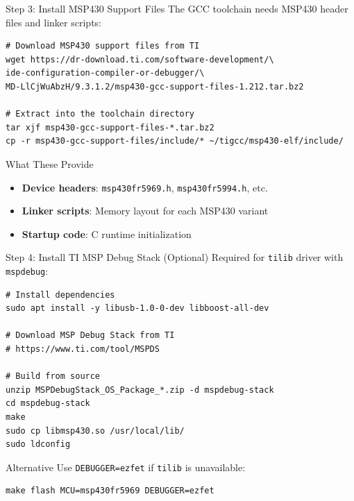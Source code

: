 \documentclass[aspectratio=169, 10pt]{beamer}
\begin{document}
\begin{frame}[fragile]{Step 3: Install MSP430 Support Files}
The GCC toolchain needs MSP430 header files and linker scripts:
\begin{lstlisting}[style=bashstyle]
# Download MSP430 support files from TI
wget https://dr-download.ti.com/software-development/\
ide-configuration-compiler-or-debugger/\
MD-LlCjWuAbzH/9.3.1.2/msp430-gcc-support-files-1.212.tar.bz2

# Extract into the toolchain directory
tar xjf msp430-gcc-support-files-*.tar.bz2
cp -r msp430-gcc-support-files/include/* ~/tigcc/msp430-elf/include/
\end{lstlisting}

\vspace{0.5em}
\begin{block}{What These Provide}
\begin{itemize}
  \item \textbf{Device headers}: \texttt{msp430fr5969.h}, \texttt{msp430fr5994.h}, etc.
  \item \textbf{Linker scripts}: Memory layout for each MSP430 variant
  \item \textbf{Startup code}: C runtime initialization
\end{itemize}
\end{block}
\end{frame}

\begin{frame}[fragile]{Step 4: Install TI MSP Debug Stack (Optional)}
Required for \texttt{tilib} driver with \texttt{mspdebug}:
\begin{lstlisting}[style=bashstyle]
# Install dependencies
sudo apt install -y libusb-1.0-0-dev libboost-all-dev

# Download MSP Debug Stack from TI
# https://www.ti.com/tool/MSPDS

# Build from source
unzip MSPDebugStack_OS_Package_*.zip -d mspdebug-stack
cd mspdebug-stack
make
sudo cp libmsp430.so /usr/local/lib/
sudo ldconfig
\end{lstlisting}

\begin{alertblock}{Alternative}
Use \texttt{DEBUGGER=ezfet} if \texttt{tilib} is unavailable:
\begin{lstlisting}[style=bashstyle]
make flash MCU=msp430fr5969 DEBUGGER=ezfet
\end{lstlisting}
\end{alertblock}
\end{frame}
\end{document}
